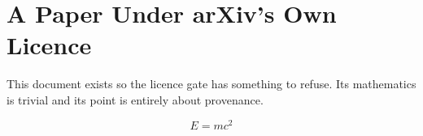 \documentclass{article}
\begin{document}
\section{A Paper Under arXiv's Own Licence}

This document exists so the licence gate has something to refuse. Its mathematics is
trivial and its point is entirely about provenance.

\begin{equation}\tag{1}
E = mc^{2}
\end{equation}
\end{document}
